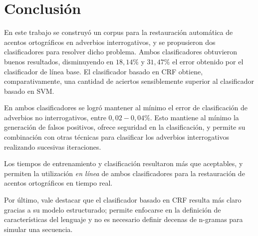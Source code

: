 \documentclass[runningheads,a4paper]{llncs}
\begin{document}
\section{Conclusión}
\label{sec:Conclusiones}

En este trabajo se construyó un corpus para la restauración automática de acentos ortográficos en adverbios interrogativos, y se propusieron dos clasificadores para resolver dicho problema. Ambos clasificadores obtuvieron buenos resultados, disminuyendo en $18,14\%$ y $31,47\%$ el error obtenido por el clasificador de línea base. El clasificador basado en CRF obtiene, comparativamente, una cantidad de aciertos sensiblemente superior al clasificador basado en SVM. 

En ambos clasificadores se logr\'o mantener al m\'inimo el error de clasificaci\'on de adverbios no interrogativos, entre $0,02-0,04\%$. Esto mantiene al m\'inimo la generaci\'on de falsos positivos, ofrece seguridad en la clasificaci\'on, y permite su combinaci\'on con otras t\'ecnicas para clasificar los adverbios interrogativos realizando sucesivas iteraciones.

Los tiempos de entrenamiento y clasificación resultaron más que aceptables, y permiten la utilización \emph{en línea} de ambos clasificadores para la restauración de acentos ortogr\'aficos en tiempo real.

Por \'ultimo, vale destacar que el clasificador basado en CRF resulta m\'as claro gracias a su modelo estructurado; permite enfocarse en la definición de características del lenguaje y no es necesario definir decenas de n-gramas para simular una secuencia.



\end{document}
